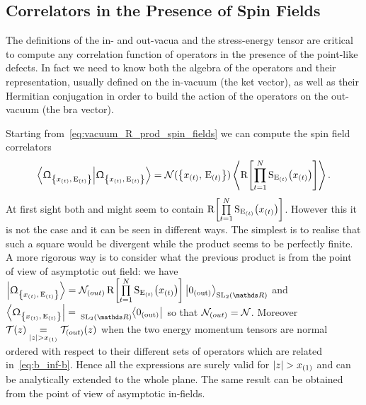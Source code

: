\subsection{Correlators in the Presence of Spin Fields}
\label{sec:spin_correlators}
      
The definitions of the in- and out-vacua and the stress-energy tensor are critical to compute any correlation function of operators in the presence of the point-like defects.
In fact we need to know both the algebra of the operators and their representation, usually defined on the in-vacuum (the ket vector), as well as their Hermitian conjugation in order to build the action of the operators on the out-vacuum (the bra vector).

Starting from~\eqref{eq:vacuum_R_prod_spin_fields} we can compute the spin field correlators
\begin{equation}
  \braket{\GGexcvac}
  =
  \cN(\qty{x_{(t)},\, \rE_{(t)} })
  \left\langle
    \rR\qty[%
      \finiteprod{t}{1}{N} \rS_{\rE_{(t)}}\qty(x_{(t)})
    ]
  \right\rangle.
\end{equation}
At first sight both \GGexcvacket and \GGexcvacbra might seem to contain $\mathrm{R}\qty[ \prod\limits_{t = 1}^{N} \mathrm{S}_{\mathrm{E}_{(t)}}\qty(x_{(t)}) ]$.
However this it is not the case and it can be seen in different ways.
The simplest is to realise that such a square would be divergent while the product seems to be perfectly finite.
A more rigorous way is to consider what the previous product is from the point of view of asymptotic out field: we have $\GGexcvacket= \cN_{(out)}\, \rR\qty[ \finiteprod{t}{1}{N} \rS_{\rE_{(t)}}\qty(x_{(t)}) ] \regvacuumout$ and $\GGexcvacbra= \regvacuumoutconj$ so that $\mathcal{N}_{(out)} = \mathcal{N}$.
Moreover $\mathcal{T}\qty(z) \underset{\abs{z} > x_{(1)}}{=} \mathcal{T}_{(out)}\qty(z)$ when the two energy momentum tensors are normal ordered with respect to their different sets of operators which are related in~\eqref{eq:b_inf-b}.
Hence all the expressions are surely valid for $\abs{z} > x_{(1)}$ and can be analytically extended to the whole plane. 
The same result can be obtained from the point of view of asymptotic in-fields. 
   
